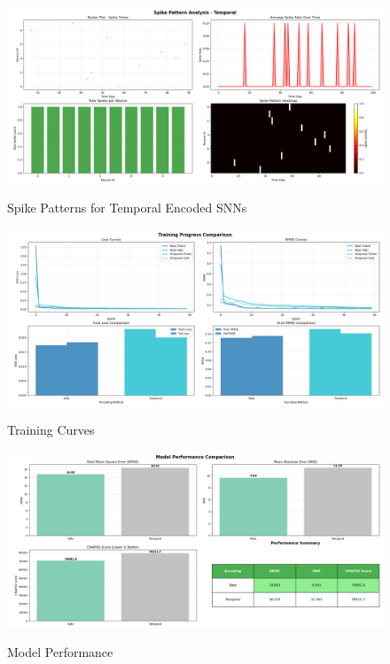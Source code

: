 \documentclass[11pt]{article}
\begin{document}
\begin{figure}%
    \centering
    {\includegraphics[width=15cm]{spikePattern_2.png} }
    \caption{Spike Patterns for Temporal Encoded SNNs}%
    \label{fig:example2}%
\end{figure}


\begin{figure}%
    \centering
    {\includegraphics[width=15cm]{TrainingCurves.png} }
    \caption{Training Curves}%
    \label{fig:example3}%
\end{figure}

\begin{figure}%
    \centering
    {\includegraphics[width=15cm]{ModelPerformance.png} }
    \caption{Model Performance}%
    \label{fig:example4}%
\end{figure}
\end{document}
